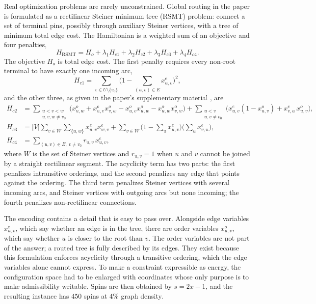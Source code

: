 \documentclass[11pt]{article}
\theoremstyle{definition}
\theoremstyle{remark}
\begin{document}
Real optimization problems are rarely unconstrained. Global routing in the paper is formulated as a rectilinear Steiner minimum tree (RSMT) problem: connect a set of terminal pins, possibly through auxiliary Steiner vertices, with a tree of minimum total edge cost. The Hamiltonian is a weighted sum of an objective and four penalties,
\begin{equation}
H_{\mathrm{RSMT}} = H_o + \lambda_1 H_{c1} + \lambda_2 H_{c2} + \lambda_3 H_{c3} + \lambda_4 H_{c4}.
\end{equation}
The objective $H_o$ is total edge cost. The first penalty requires every non-root terminal to have exactly one incoming arc,
\begin{equation}
H_{c1} = \sum_{v \in U \setminus \{v_0\}} \Big( 1 - \sum_{(u,v) \in E} x^e_{u,v} \Big)^2 ,
\end{equation}
and the other three, as given in the paper's supplementary material \cite{li2026}, are
\begin{align}
H_{c2} &= \sum_{\substack{u<v<w\\ u,v,w \neq v_0}} \big( x^o_{u,w} + x^o_{u,v} x^o_{v,w} - x^o_{u,v} x^o_{u,w} - x^o_{u,w} x^o_{v,w} \big)
+ \sum_{\substack{u<v\\ u,v \neq v_0}} \big( x^e_{u,v}(1 - x^o_{u,v}) + x^e_{v,u}\, x^o_{u,v} \big), \\
H_{c3} &= |V| \sum_{v \in W} \sum_{\{u,w\}} x^e_{u,v} x^e_{w,v} + \sum_{v \in W} \Big( 1 - \sum_{u} x^e_{u,v} \Big) \Big( \sum_{u} x^e_{v,u} \Big), \\
H_{c4} &= \sum_{(u,v) \in E,\ v \neq v_0} r_{u,v}\, x^e_{u,v},
\end{align}
where $W$ is the set of Steiner vertices and $r_{u,v} = 1$ when $u$ and $v$ cannot be joined by a straight rectilinear segment. The acyclicity term has two parts: the first penalizes intransitive orderings, and the second penalizes any edge that points against the ordering. The third term penalizes Steiner vertices with several incoming arcs, and Steiner vertices with outgoing arcs but none incoming; the fourth penalizes non-rectilinear connections.

The encoding contains a detail that is easy to pass over. Alongside edge variables $x^e_{u,v}$, which say whether an edge is in the tree, there are order variables $x^o_{u,v}$, which say whether $u$ is closer to the root than $v$. The order variables are not part of the answer; a routed tree is fully described by its edges. They exist because this formulation enforces acyclicity through a transitive ordering, which the edge variables alone cannot express. To make a constraint expressible as energy, the configuration space had to be enlarged with coordinates whose only purpose is to make admissibility writable. Spins are then obtained by $s = 2x - 1$, and the resulting instance has $450$ spins at $4\%$ graph density.
\end{document}
